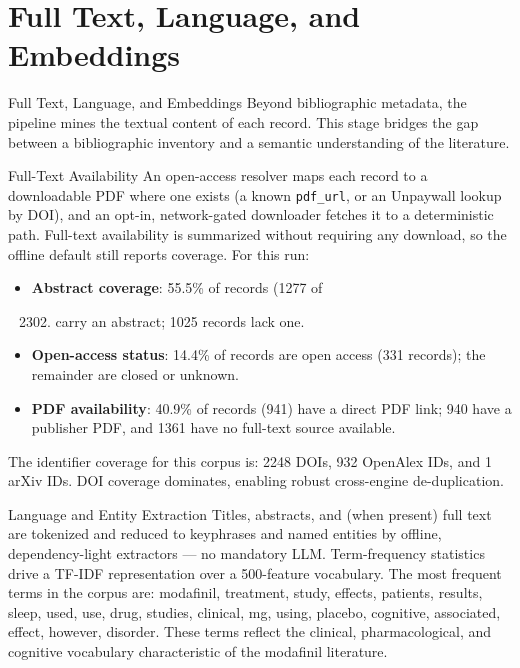 \documentclass[
  ignorenonframetext,
]{beamer}
\author{\texorpdfstring{}{}}
\date{}
\providecommand{\tightlist}{%
  \setlength{\itemsep}{0pt}\setlength{\parskip}{0pt}}
\begin{document}
\section{Full Text, Language, and
Embeddings}\label{full-text-language-and-embeddings}

\begin{frame}[allowframebreaks]{Full Text, Language, and Embeddings}
Beyond bibliographic metadata, the pipeline mines the textual content of
each record. This stage bridges the gap between a bibliographic
inventory and a semantic understanding of the literature.
\end{frame}

\begin{frame}{Full-Text Availability}
\protect{}\label{full-text-availability}
An open-access resolver maps each record to a downloadable PDF where one
exists (a known \texttt{pdf\_url}, or an Unpaywall lookup by DOI), and
an opt-in, network-gated downloader fetches it to a deterministic path.
Full-text availability is summarized without requiring any download, so
the offline default still reports coverage. For this run:

\begin{itemize}
\tightlist
\item
  \textbf{Abstract coverage}: 55.5\% of records (1277 of

  \begin{enumerate}
  [1)]
  \setcounter{enumi}{2301}
  \tightlist
  \item
    carry an abstract; 1025 records lack one.
  \end{enumerate}
\item
  \textbf{Open-access status}: 14.4\% of records are open access (331
  records); the remainder are closed or unknown.
\item
  \textbf{PDF availability}: 40.9\% of records (941) have a direct PDF
  link; 940 have a publisher PDF, and 1361 have no full-text source
  available.
\end{itemize}

The identifier coverage for this corpus is: 2248 DOIs, 932 OpenAlex IDs,
and 1 arXiv IDs. DOI coverage dominates, enabling robust cross-engine
de-duplication.
\end{frame}

\begin{frame}[allowframebreaks]{Language and Entity Extraction}
\protect{}\label{language-and-entity-extraction}
Titles, abstracts, and (when present) full text are tokenized and
reduced to keyphrases and named entities by offline, dependency-light
extractors --- no mandatory LLM. Term-frequency statistics drive a
TF-IDF representation over a 500-feature vocabulary. The most frequent
terms in the corpus are: modafinil, treatment, study, effects, patients,
results, sleep, used, use, drug, studies, clinical, mg, using, placebo,
cognitive, associated, effect, however, disorder. These terms reflect
the clinical, pharmacological, and cognitive vocabulary characteristic
of the modafinil literature.
\end{frame}
\end{document}
